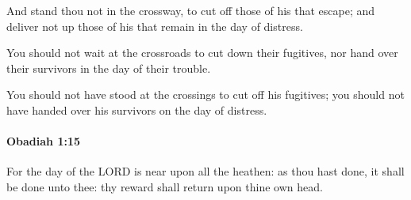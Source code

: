 			\begin{versebox}
					\item[BHS] 
					\item[LXX] 
					\item[ASV] And stand thou not in the crossway, to cut off those of his that escape; and deliver not up those of his that remain in the day of distress.
					\item[NIV] You should not wait at the crossroads to cut down their fugitives, nor hand over their survivors in the day of their trouble.
					\item[NRSV] You should not have stood at the crossings to cut off his fugitives; you should not have handed over his survivors on the day of distress.
			\end{versebox}

		\paragraph{Obadiah 1:15} %
			\label{OBADIAH-1-15}

			For the day of the LORD is near upon all the heathen: as thou hast done, it shall be done unto thee: thy reward shall return upon thine own head.

